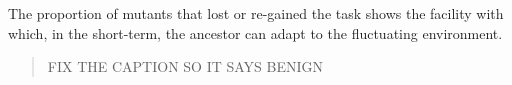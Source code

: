 The proportion of mutants that lost or re-gained the task shows the facility with which, in the short-term, the ancestor can adapt to the fluctuating environment. 
\begin{quote}
FIX THE CAPTION SO IT SAYS BENIGN
\end{quote}